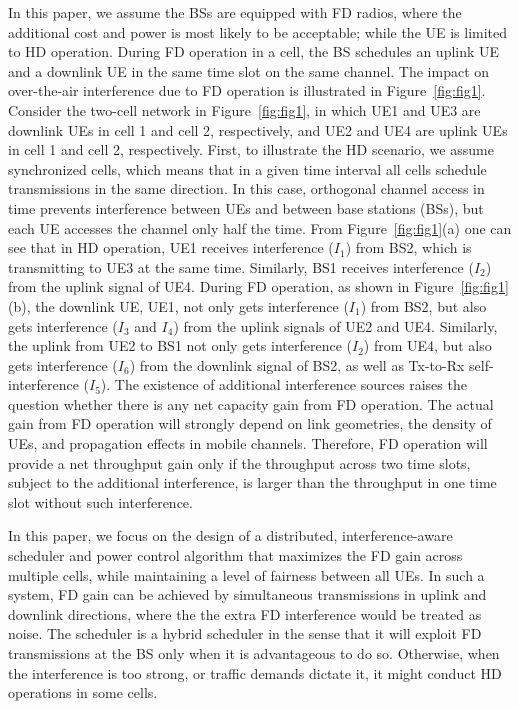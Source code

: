 \documentclass[journal]{IEEEtran}
\begin{document}
In this paper, we assume the BSs are equipped with FD radios, where the additional cost and power is most likely to be acceptable; while the UE is limited to HD operation. During FD operation in a cell, the BS schedules an uplink UE and a downlink UE in the same time slot on the same channel. The impact on over-the-air interference due to FD operation is illustrated in Figure~\ref{fig:fig1}. Consider the two-cell network in Figure~\ref{fig:fig1}, in which UE1 and UE3 are downlink UEs in cell 1 and cell 2, respectively, and UE2 and UE4 are uplink UEs in cell 1 and cell 2, respectively. First, to illustrate the HD scenario, we assume synchronized cells, which means that in a given time interval all cells schedule transmissions in the same direction. In this case, orthogonal channel access in time prevents interference between UEs and between base stations (BSs), but each UE accesses the channel only half the time. From Figure~\ref{fig:fig1}(a) one can see that in HD operation, UE1 receives interference ($I_1$) from BS2, which is transmitting to UE3 at the same time. Similarly, BS1 receives interference ($I_2$) from the uplink signal of UE4. During FD operation, as shown in Figure~\ref{fig:fig1}(b), the downlink UE, UE1, not only gets interference ($I_1$) from BS2, but also gets interference ($I_3$ and $I_4$) from the uplink signals of UE2 and UE4. Similarly, the uplink from UE2 to BS1 not only gets interference ($I_2$) from UE4, but also gets interference ($I_6$) from the downlink signal of BS2, as well as Tx-to-Rx self-interference ($I_5$). The existence of additional interference sources raises the question whether there is any net capacity gain from FD operation. The actual gain from FD operation will strongly depend on link geometries, the density of UEs, and propagation effects in mobile channels. Therefore, FD operation will provide a net throughput gain only if the throughput across two time slots, subject to the additional interference, is larger than the throughput in one time slot without such interference.

In this paper, we focus on the design of a distributed, interference-aware scheduler and power control algorithm that maximizes the FD gain across multiple cells, while maintaining a level of fairness between all UEs.  In such a system, FD gain can be achieved by simultaneous transmissions in uplink and downlink directions, where the the extra FD interference would be treated as noise. The scheduler is a hybrid scheduler in the sense that it will exploit FD transmissions at the BS only when it is advantageous to do so. Otherwise, when the interference is too strong, or traffic demands dictate it, it might conduct HD operations in some cells.
\end{document}
